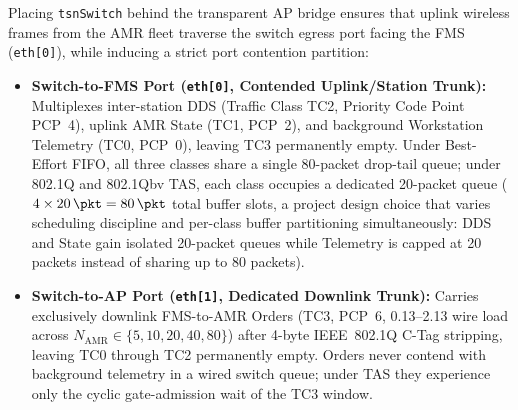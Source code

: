 \documentclass[11pt,a4paper]{article}
\newcommand{\Namr}{\ensuremath{N_{\mathrm{AMR}}}}
\begin{document}
Placing \texttt{tsnSwitch} behind the transparent AP bridge ensures that uplink wireless frames from the AMR fleet traverse the switch egress port facing the FMS (\texttt{eth[0]}), while inducing a strict port contention partition:
\begin{itemize}[leftmargin=1.8em]
    \item \textbf{Switch-to-FMS Port (\texttt{eth[0]}, Contended Uplink/Station Trunk):} Multiplexes inter-station DDS (Traffic Class TC2, Priority Code Point PCP~4), uplink AMR State (TC1, PCP~2), and background Workstation Telemetry (TC0, PCP~0), leaving TC3 permanently empty. Under Best-Effort FIFO, all three classes share a single 80-packet drop-tail queue; under 802.1Q and 802.1Qbv TAS, each class occupies a dedicated 20-packet queue ($4 \times \qty{20}{\pkt} = \qty{80}{\pkt}$ total buffer slots, a project design choice that varies scheduling discipline and per-class buffer partitioning simultaneously: DDS and State gain isolated 20-packet queues while Telemetry is capped at 20 packets instead of sharing up to 80 packets).
    \item \textbf{Switch-to-AP Port (\texttt{eth[1]}, Dedicated Downlink Trunk):} Carries exclusively downlink FMS-to-AMR Orders (TC3, PCP~6, \qtyrange{0.13}{2.13}{\mbps} wire load across $\Namr \in \{5, 10, 20, 40, 80\}$) after 4-byte IEEE~802.1Q C-Tag stripping, leaving TC0 through TC2 permanently empty. Orders never contend with background telemetry in a wired switch queue; under TAS they experience only the cyclic gate-admission wait of the TC3 window.
\end{itemize}
\end{document}
